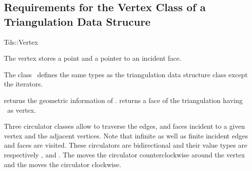\subsection{Requirements for the Vertex Class of a Triangulation Data Strucure}
\label{I1_Sect_Tds_Vertex}
\begin{ccClass}{Tds::Vertex}

\ccThreeToTwo

The vertex stores a point and a pointer to an incident face.

\ccInheritsFrom {}

\ccTypes
The class \ccClassName\
defines the same types as the triangulation data structure class 
except the iterators.












{returns  the geometric information of \ccVar.}
\ccGlue
{}
{returns a face of the triangulation having  \ccVar\ as vertex.}

Three circulator classes allow to traverse the edges, and faces
incident to a given vertex and the adjacent vertices.
Note that infinite as well as finite incident edges and faces are visited.
 These circulators are bidirectional
and their value types are respectively , 
and .
The   moves the circulator
counterclockwise around the vertex 
and  the  moves the circulator
clockwise. 


\end{ccClass}
